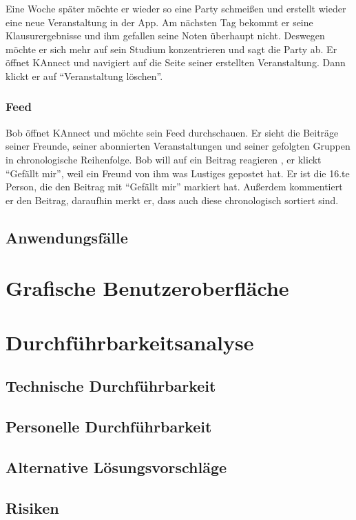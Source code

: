 \documentclass[parskip=full]{scrartcl}
\begin{document}
		Eine Woche später möchte er wieder so eine Party schmeißen und erstellt wieder eine neue Veranstaltung in der App. Am nächsten Tag bekommt er seine Klausurergebnisse und ihm gefallen seine Noten überhaupt nicht. Deswegen möchte er sich mehr auf sein Studium konzentrieren und sagt die Party ab. Er öffnet KAnnect und navigiert auf die Seite seiner erstellten Veranstaltung. Dann klickt er auf “Veranstaltung löschen”.
		
		\subsubsection{Feed}
		Bob öffnet KAnnect und möchte sein Feed durchschauen. Er sieht die Beiträge seiner Freunde, seiner abonnierten Veranstaltungen und seiner gefolgten Gruppen in chronologische Reihenfolge.
		Bob will auf ein Beitrag reagieren , er klickt “Gefällt mir”, weil ein Freund von ihm was Lustiges gepostet hat. Er ist die 16.te Person, die den Beitrag mit “Gefällt mir” markiert hat. Außerdem kommentiert er den Beitrag, daraufhin merkt er, dass auch diese chronologisch sortiert sind.
		
	\subsection{Anwendungsfälle}
	
	\section{Grafische Benutzeroberfläche}
	
	\section{Durchführbarkeitsanalyse}
	
	\subsection{Technische Durchführbarkeit}
	\subsection{Personelle Durchführbarkeit}
	\subsection{Alternative Lösungsvorschläge}
	\subsection{Risiken}
	
	
		
	
	
\end{document}
